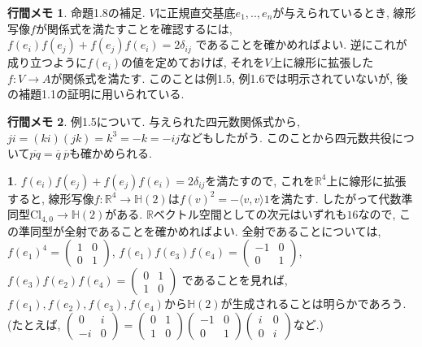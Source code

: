 \documentclass[dvipdfmx]{amsart}
\theoremstyle{definition}
\newtheorem{ans}{}
\numberwithin{ans}{section}
\newtheorem{mynote}{行間メモ}
\numberwithin{mynote}{section}
\newenvironment{note}
  {\begin{leftbar}\begin{mynote}}
  {\end{mynote}\end{leftbar}}
\begin{document}
\begin{note}
  命題1.8の補足. $V$に正規直交基底$e_1,..,e_n$が与えられているとき,
  線形写像$f$が関係式を満たすことを確認するには,
  $f(e_i)f(e_j) + f(e_j)f(e_i) = 2\delta_{ij}$
  であることを確かめればよい.
  逆にこれが成り立つように$f(e_i)$の値を定めておけば, それを$V$上に線形に拡張した
  $f: V \rightarrow A$が関係式を満たす.
  このことは例1.5, 例1.6では明示されていないが, 後の補題1.1の証明に用いられている.
\end{note}

\begin{note}
  例1.5について. 与えられた四元数関係式から, $ji = (ki)(jk) = k^3 = -k = -ij$などもしたがう.
  このことから四元数共役について$\overline{pq} = \overline{q}\ \overline{p}$も確かめられる.
\end{note}

\begin{ans}
  $f(e_i)f(e_j) + f(e_j)f(e_i) = 2\delta_{ij}$を満たすので,
  これを$\mathbb{R}^4$上に線形に拡張すると,
  線形写像$f: \mathbb{R}^4 \rightarrow \mathbb{H}(2)$は$f(v)^2 = -\langle v, v \rangle 1$を満たす.
  したがって代数準同型$\mathrm{Cl}_{4, 0} \rightarrow \mathbb{H}(2)$がある.
  $\mathbb{R}$ベクトル空間としての次元はいずれも$16$なので, この準同型が全射であることを確かめればよい.
  全射であることについては,
  $f(e_1)^4 = \begin{pmatrix}
    1 & 0 \\
    0 & 1
  \end{pmatrix}$,
  $f(e_1)f(e_3)f(e_4) = \begin{pmatrix}
    -1 & 0 \\
    0 & 1
  \end{pmatrix}$,
  $f(e_3)f(e_2)f(e_4) = \begin{pmatrix}
    0 & 1 \\
    1 & 0
  \end{pmatrix}$
  であることを見れば, $f(e_1), f(e_2), f(e_3), f(e_4)$から$\mathbb{H}(2)$が生成されることは明らかであろう.
  (たとえば, $\begin{pmatrix}
    0 & i \\
    -i & 0
  \end{pmatrix} = \begin{pmatrix}
    0 & 1 \\
    1 & 0
  \end{pmatrix}\begin{pmatrix}
    -1 & 0 \\
    0 & 1
  \end{pmatrix}\begin{pmatrix}
    i & 0 \\
    0 & i
  \end{pmatrix}$など.)
\end{ans}
\end{document}
